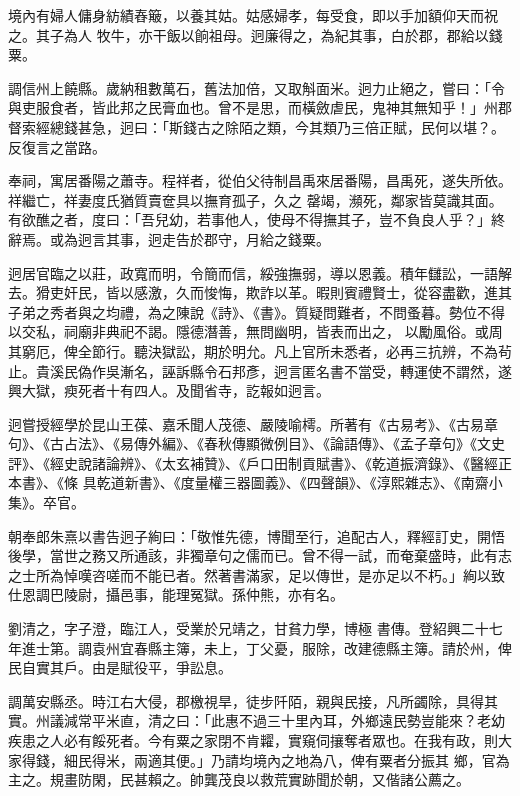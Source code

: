 \begin{pinyinscope}
 境內有婦人傭身紡績舂簸，以養其姑。姑感婦孝，每受食，即以手加額仰天而祝之。其子為人
 牧牛，亦干飯以餉祖母。迥廉得之，為紀其事，白於郡，郡給以錢粟。



 調信州上饒縣。歲納租數萬石，舊法加倍，又取斛面米。迥力止絕之，嘗曰：「令與吏服食者，皆此邦之民膏血也。曾不是思，而橫斂虐民，鬼神其無知乎！」州郡督索經總錢甚急，迥曰：「斯錢古之除陌之類，今其類乃三倍正賦，民何以堪？。反復言之當路。



 奉祠，寓居番陽之蕭寺。程祥者，從伯父待制昌禹來居番陽，昌禹死，遂失所依。祥繼亡，祥妻度氏猶質賣奩具以撫育孤子，久之
 罄竭，瀕死，鄰家皆莫識其面。有欲醮之者，度曰：「吾兒幼，若事他人，使母不得撫其子，豈不負良人乎？」終辭焉。或為迥言其事，迥走告於郡守，月給之錢粟。



 迥居官臨之以莊，政寬而明，令簡而信，綏強撫弱，導以恩義。積年讎訟，一語解去。猾吏奸民，皆以感激，久而悛悔，欺詐以革。暇則賓禮賢士，從容盡歡，進其子弟之秀者與之均禮，為之陳說《詩》、《書》。質疑問難者，不問蚤暮。勢位不得以交私，祠廟非典祀不謁。隱德潛善，無問幽明，皆表而出之，
 以勵風俗。或周其窮厄，俾全節行。聽決獄訟，期於明允。凡上官所未悉者，必再三抗辨，不為茍止。貴溪民偽作吳漸名，誣訴縣令石邦彥，迥言匿名書不當受，轉運使不謂然，遂興大獄，瘐死者十有四人。及聞省寺，訖報如迥言。



 迥嘗授經學於昆山王葆、嘉禾聞人茂德、嚴陵喻樗。所著有《古易考》、《古易章句》、《古占法》、《易傳外編》、《春秋傳顯微例目》、《論語傳》、《孟子章句》《文史評》、《經史說諸論辨》、《太玄補贊》、《戶口田制貢賦書》、《乾道振濟錄》、《醫經正本書》、《條
 具乾道新書》、《度量權三器圖義》、《四聲韻》、《淳熙雜志》、《南齋小集》。卒官。



 朝奉郎朱熹以書告迥子絢曰：「敬惟先德，博聞至行，追配古人，釋經訂史，開悟後學，當世之務又所通該，非獨章句之儒而已。曾不得一試，而奄棄盛時，此有志之士所為悼嘆咨嗟而不能已者。然著書滿家，足以傳世，是亦足以不朽。」絢以致仕恩調巴陵尉，攝邑事，能理冤獄。孫仲熊，亦有名。



 劉清之，字子澄，臨江人，受業於兄靖之，甘貧力學，博極
 書傳。登紹興二十七年進士第。調袁州宜春縣主簿，未上，丁父憂，服除，改建德縣主簿。請於州，俾民自實其戶。由是賦役平，爭訟息。



 調萬安縣丞。時江右大侵，郡檄視旱，徒步阡陌，親與民接，凡所蠲除，具得其實。州議減常平米直，清之曰：「此惠不過三十里內耳，外鄉遠民勢豈能來？老幼疾患之人必有餒死者。今有粟之家閉不肯糶，實窺伺攘奪者眾也。在我有政，則大家得錢，細民得米，兩適其便。」乃請均境內之地為八，俾有粟者分振其
 鄉，官為主之。規畫防閑，民甚賴之。帥龔茂良以救荒實跡聞於朝，又偕諸公薦之。




\end{pinyinscope}
